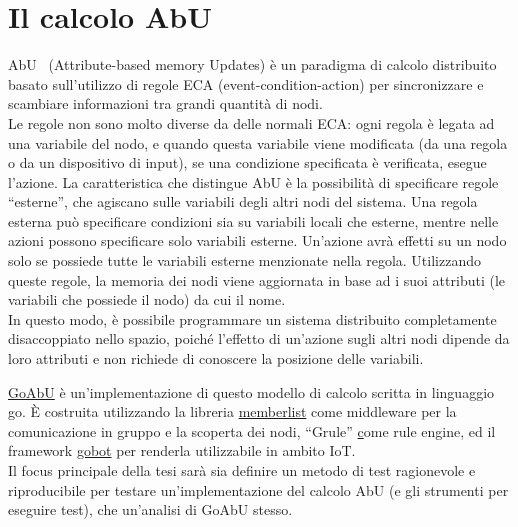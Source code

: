 \documentclass[12pt, a4paper]{article}
\begin{document}
\newpage
\tableofcontents

\newpage
\section{Il calcolo AbU}

AbU~\cite{MP-ICTAC-2021} (Attribute-based memory Updates) è un paradigma di calcolo distribuito basato sull'utilizzo di regole ECA (event-condition-action) per sincronizzare e scambiare informazioni tra grandi quantità di nodi.\\
Le regole non sono molto diverse da delle normali ECA: ogni regola è legata ad una variabile del nodo, e quando questa variabile viene modificata (da una regola o da un dispositivo di input), se una condizione specificata è verificata, esegue l'azione.
La caratteristica che distingue AbU è la possibilità di specificare regole ``esterne'', che agiscano sulle variabili degli altri nodi del sistema. Una regola esterna può specificare condizioni sia su variabili locali che esterne, mentre nelle azioni possono specificare solo variabili esterne. Un'azione avrà effetti su un nodo solo se possiede tutte le variabili esterne menzionate nella regola.
Utilizzando queste regole, la memoria dei nodi viene aggiornata in base ad i suoi attributi (le variabili che possiede il nodo) da cui il nome.\\
In questo modo, è possibile programmare un sistema distribuito completamente disaccoppiato nello spazio, poiché l'effetto di un'azione sugli altri nodi dipende da loro attributi e non richiede di conoscere la posizione delle variabili.

\href{https://github.com/abu-lang/goabu}{GoAbU} è un'implementazione di questo modello di calcolo scritta in linguaggio go.
È costruita utilizzando la libreria \href{https://github.com/hashicorp/memberlist}{memberlist} come middleware per la comunicazione in gruppo e la scoperta dei nodi, ``Grule'' \href{https://github.com/hyperjumptech/grule-rule-engine} come rule engine, ed il framework \href{https://github.com/hybridgroup/gobot/}{gobot} per renderla utilizzabile in ambito IoT.\\
Il focus principale della tesi sarà sia definire un metodo di test ragionevole e riproducibile per testare un'implementazione del calcolo AbU (e gli strumenti per eseguire test), che un'analisi di GoAbU stesso.
\end{document}
